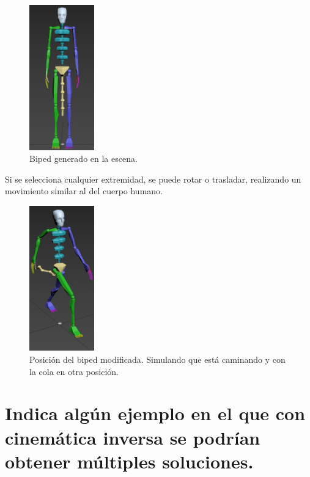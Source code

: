 \documentclass[]{article}
\begin{document}
\begin{figure}[H]
   \centering
   \includegraphics[width=0.25\textwidth]{imagenes/biped2.png}
   \caption{Biped generado en la escena.}
\end{figure}

Si se selecciona cualquier extremidad, se puede rotar o trasladar, realizando un movimiento similar al del cuerpo humano.

\begin{figure}[H]
   \centering
   \includegraphics[width=0.25\textwidth]{imagenes/bipedWalk2.png}
   \caption{Posición del biped modificada. Simulando que está caminando y con la cola en otra posición.}
\end{figure}

\newpage

\section{Indica algún ejemplo en el que con cinemática inversa se podrían obtener múltiples soluciones.}
\end{document}
